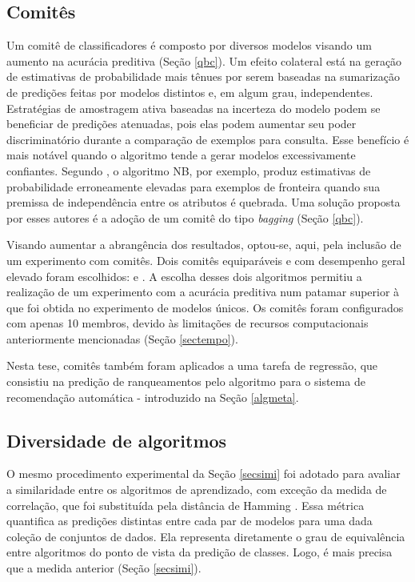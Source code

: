 \subsection{Comitês}\label{algensembles}
Um comitê de classificadores é composto por diversos modelos visando um aumento na acurácia preditiva (Seção \ref{qbc}).
Um efeito colateral está na geração de estimativas de probabilidade mais tênues por serem baseadas na sumarização de predições feitas por modelos distintos e, em algum grau, independentes.
Estratégias de amostragem ativa baseadas na incerteza do modelo podem se beneficiar de predições atenuadas, pois elas podem aumentar seu poder discriminatório durante a comparação de exemplos para consulta.
Esse benefício é mais notável quando o algoritmo tende a gerar modelos excessivamente confiantes.
Segundo , o algoritmo NB, por exemplo, produz estimativas de probabilidade erroneamente elevadas para exemplos de fronteira quando sua premissa de independência entre os atributos é quebrada.
Uma solução proposta por esses autores é a adoção de um comitê do tipo \textit{bagging} (Seção \ref{qbc}).

Visando aumentar a abrangência dos resultados, optou-se, aqui, pela inclusão de um experimento com comitês.
Dois comitês equiparáveis e com desempenho geral elevado \cite{journals/jmlr/DelgadoCBA14} foram escolhidos:  e 
\cite{journals/pami/RodriguezKA06,journals/ml/Breiman01}.
A escolha desses dois algoritmos permitiu a realização de um experimento com a acurácia preditiva num patamar superior à que foi obtida no experimento de modelos únicos.
Os comitês foram configurados com apenas 10 membros, devido às limitações de recursos computacionais anteriormente mencionadas (Seção \ref{sectempo}).

Nesta tese, comitês também foram aplicados a uma tarefa de regressão, que consistiu na predição de ranqueamentos pelo algoritmo  para o sistema de recomendação automática - introduzido na Seção \ref{algmeta}.

\subsection{Diversidade de algoritmos}
O mesmo procedimento experimental da Seção \ref{secsimi} foi adotado para avaliar a similaridade entre os algoritmos de aprendizado,
com exceção da medida de correlação, que foi substituída pela distância de Hamming \cite{hamming1950error}.
Essa métrica quantifica as predições distintas entre cada par de modelos para uma dada coleção de conjuntos de dados.
Ela representa diretamente o grau de equivalência entre algoritmos do ponto de vista da predição de classes.
Logo, é mais precisa que a medida anterior (Seção \ref{secsimi}).

